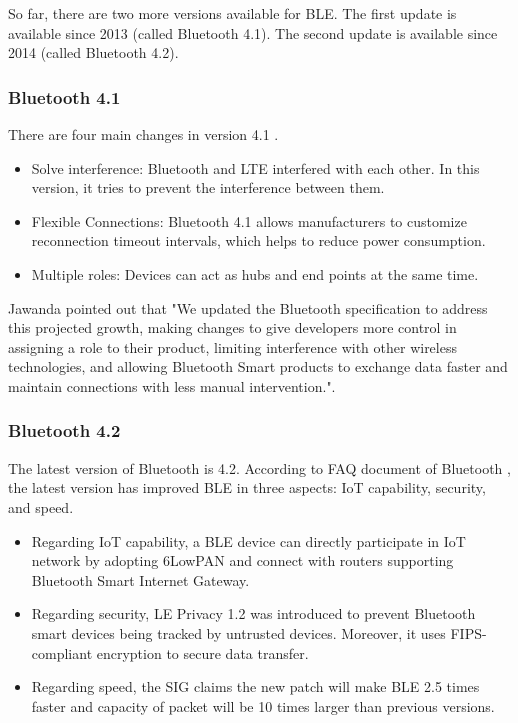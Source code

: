 \documentclass{Nan_Thesis}
\begin{document}
So far, there are two more versions available for BLE. The first update is available since 2013 (called Bluetooth 4.1). The second update is available since 2014 (called Bluetooth 4.2).
\subsubsection{Bluetooth 4.1} 
There are four main changes in version 4.1 \cite{SIG2013updaebluetooth4.1}.

\begin{itemize}
  \item Solve interference: Bluetooth and LTE interfered with each other. In this version, it tries to prevent the interference between them.
  \item Flexible Connections: Bluetooth 4.1 allows manufacturers to customize reconnection timeout intervals, which helps to reduce power consumption.
  \item Multiple roles: Devices can act as hubs and end points at the same time.
\end{itemize}

Jawanda \cite{SIG2013updaebluetooth4.1} pointed out that "We updated the Bluetooth specification to address this projected growth, making changes to give developers more control in assigning a role to their product, limiting interference with other wireless technologies, and allowing Bluetooth Smart products to exchange data faster and maintain connections with less manual intervention.".
\subsubsection{Bluetooth 4.2} 
The latest version of Bluetooth is 4.2. According to FAQ document of Bluetooth \cite{SIG2014bluetooth4.2faq}, the latest version has improved BLE in three aspects: IoT capability, security, and speed. 

\begin{itemize}
  \item Regarding IoT capability, a BLE device can directly participate in IoT network by adopting 6LowPAN and connect with routers supporting Bluetooth Smart Internet Gateway. 
  \item Regarding security, LE Privacy 1.2 was introduced to prevent Bluetooth smart devices being tracked by untrusted devices. Moreover, it uses FIPS-compliant encryption to secure data transfer.
  \item Regarding speed, the SIG claims the new patch will make BLE 2.5 times faster and capacity of packet will be 10 times larger than previous versions. 
\end{itemize}
\end{document}
